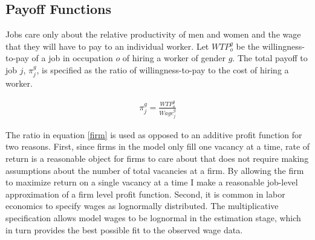 \documentclass[11pt]{article}
\begin{document}


\subsection{Payoff Functions}

Jobs care only about the relative productivity of men and women and the wage that they will have to pay to an individual worker. Let $WTP^g_o$ be the willingness-to-pay of a job in occupation $o$ of hiring a worker of gender $g$. The total payoff to job $j$, $\pi^g_j$, is specified as the ratio of willingness-to-pay to the cost of hiring a worker.

\begin{align} \label{firm}
 \pi^g_j = \frac{WTP^g_o}{Wage^g_j} 
\end{align}

The ratio in equation \ref{firm} is used as opposed to an additive profit function for two reasons. First, since firms in the model only fill one vacancy at a time, rate of return is a reasonable object for firms to care about that does not require making assumptions about the number of total vacancies at a firm. By allowing the firm to maximize return on a single vacancy at a time I make a reasonable job-level approximation of a firm level profit function. Second, it is common in labor economics to specify wages as lognormally distributed. The multiplicative specification allows model wages to be lognormal in the estimation stage, which in turn provides the best possible fit to the observed wage data.
\end{document}
